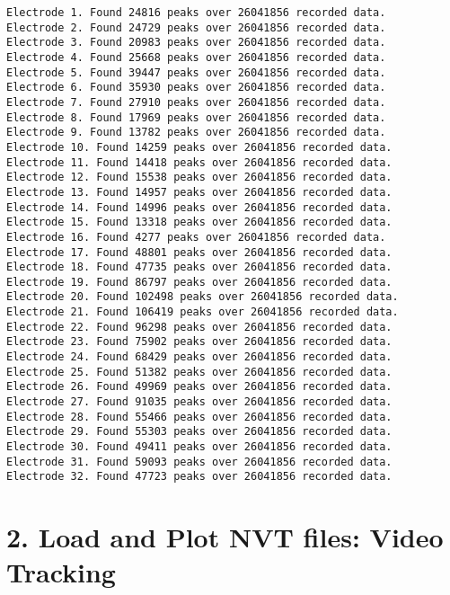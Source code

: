 \documentclass[11pt]{article}
\begin{document}
    \begin{Verbatim}[commandchars=\\\{\}]
Electrode 1. Found 24816 peaks over 26041856 recorded data.
Electrode 2. Found 24729 peaks over 26041856 recorded data.
Electrode 3. Found 20983 peaks over 26041856 recorded data.
Electrode 4. Found 25668 peaks over 26041856 recorded data.
Electrode 5. Found 39447 peaks over 26041856 recorded data.
Electrode 6. Found 35930 peaks over 26041856 recorded data.
Electrode 7. Found 27910 peaks over 26041856 recorded data.
Electrode 8. Found 17969 peaks over 26041856 recorded data.
Electrode 9. Found 13782 peaks over 26041856 recorded data.
Electrode 10. Found 14259 peaks over 26041856 recorded data.
Electrode 11. Found 14418 peaks over 26041856 recorded data.
Electrode 12. Found 15538 peaks over 26041856 recorded data.
Electrode 13. Found 14957 peaks over 26041856 recorded data.
Electrode 14. Found 14996 peaks over 26041856 recorded data.
Electrode 15. Found 13318 peaks over 26041856 recorded data.
Electrode 16. Found 4277 peaks over 26041856 recorded data.
Electrode 17. Found 48801 peaks over 26041856 recorded data.
Electrode 18. Found 47735 peaks over 26041856 recorded data.
Electrode 19. Found 86797 peaks over 26041856 recorded data.
Electrode 20. Found 102498 peaks over 26041856 recorded data.
Electrode 21. Found 106419 peaks over 26041856 recorded data.
Electrode 22. Found 96298 peaks over 26041856 recorded data.
Electrode 23. Found 75902 peaks over 26041856 recorded data.
Electrode 24. Found 68429 peaks over 26041856 recorded data.
Electrode 25. Found 51382 peaks over 26041856 recorded data.
Electrode 26. Found 49969 peaks over 26041856 recorded data.
Electrode 27. Found 91035 peaks over 26041856 recorded data.
Electrode 28. Found 55466 peaks over 26041856 recorded data.
Electrode 29. Found 55303 peaks over 26041856 recorded data.
Electrode 30. Found 49411 peaks over 26041856 recorded data.
Electrode 31. Found 59093 peaks over 26041856 recorded data.
Electrode 32. Found 47723 peaks over 26041856 recorded data.

    \end{Verbatim}

    \hypertarget{load-and-plot-nvt-files-video-tracking}{%
\section{2. Load and Plot NVT files: Video
Tracking}\label{load-and-plot-nvt-files-video-tracking}}
\end{document}
